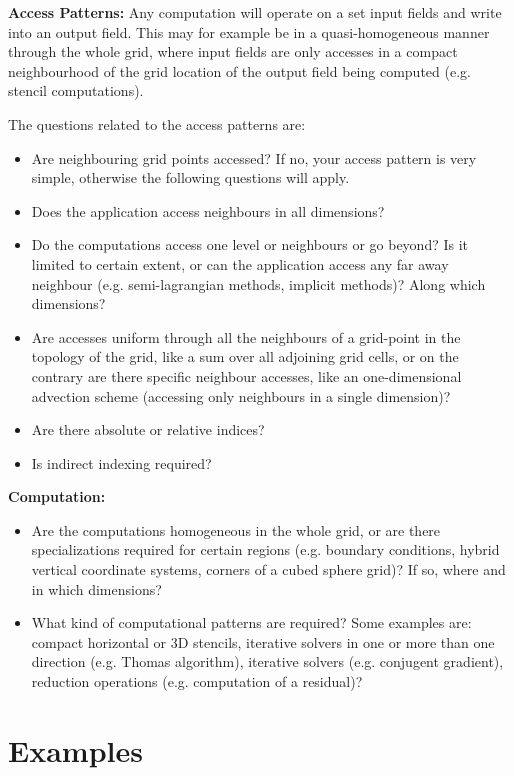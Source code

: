 \documentclass[a4paper,10pt]{scrartcl}
\begin{document}
\textbf{Access Patterns:}\newline
Any computation will operate on a set input fields and write into an output field. This may for example be in a quasi-homogeneous manner through the whole grid, where input fields are only accesses in a compact neighbourhood of the grid location
of the output field being computed (e.g. stencil computations).

The questions related to the access patterns are:
\begin{itemize} 
  \item Are neighbouring grid points accessed? If no, your access pattern is very simple, otherwise the following
  questions will apply.
  \item Does the application access neighbours in all dimensions? 
  \item Do the computations access one level or neighbours or go beyond? Is it limited to certain extent, or can
  the application access any far away neighbour (e.g. semi-lagrangian methods, implicit methods)? Along which dimensions?
  \item Are accesses uniform through all the neighbours of a grid-point in the topology of the grid,
        like a sum over all adjoining grid cells,
	or on the contrary are there specific neighbour accesses, like an one-dimensional advection scheme (accessing only neighbours in a single dimension)?
  \item Are there absolute or relative indices?
  \item Is indirect indexing required?
\end{itemize}

\textbf{Computation:}\newline
\begin{itemize}
  \item Are the computations homogeneous in the whole grid, or are there specializations required for certain regions (e.g. boundary conditions, hybrid vertical coordinate systems, corners of a cubed sphere grid)? If so, where and in which dimensions?
  \item What kind of computational patterns are required? Some examples are: compact horizontal or 3D stencils, iterative solvers in one or more than one direction (e.g. Thomas algorithm), iterative solvers (e.g. conjugent gradient), reduction operations (e.g. computation of a residual)?
\end{itemize}

\section{Examples}
\end{document}
